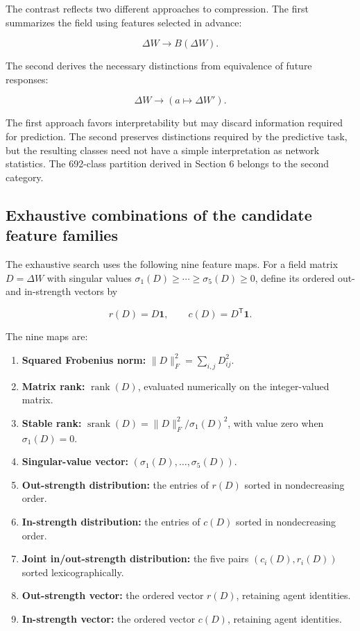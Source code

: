 \documentclass[
  11pt,
]{article}
\providecommand{\tightlist}{%
  \setlength{\itemsep}{0pt}\setlength{\parskip}{0pt}}
\begin{document}
The contrast reflects two different approaches to compression. The first
summarizes the field using features selected in advance:

\[{\Delta W\longrightarrow B(\Delta W).}\]

The second derives the necessary distinctions from equivalence of future
responses:

\[{\Delta W\longrightarrow\left(a\longmapsto\Delta W'\right).}\]

The first approach favors interpretability but may discard information
required for prediction. The second preserves distinctions required by
the predictive task, but the resulting classes need not have a simple
interpretation as network statistics. The 692-class partition derived in
Section 6 belongs to the second category.

\hypertarget{exhaustive-combinations-of-the-candidate-feature-families}{%
\subsection{Exhaustive combinations of the candidate feature
families}\label{exhaustive-combinations-of-the-candidate-feature-families}}

The exhaustive search uses the following nine feature maps. For a field
matrix \({D=\Delta W}\) with singular values
\({\sigma_1(D)\ge\cdots\ge\sigma_5(D)\ge0}\), define its ordered out-
and in-strength vectors by

\[{r(D)=D\mathbf 1,\qquad c(D)=D^{\mathsf T}\mathbf 1.}\]

The nine maps are:

\begin{enumerate}
\def\labelenumi{\arabic{enumi}.}
\tightlist
\item
  \textbf{Squared Frobenius norm:}
  \({\lVert D\rVert_F^2=\sum_{i,j}D_{ij}^2}\).
\item
  \textbf{Matrix rank:} \({\operatorname{rank}(D)}\), evaluated
  numerically on the integer-valued matrix.
\item
  \textbf{Stable rank:}
  \({\operatorname{srank}(D)=\lVert D\rVert_F^2/\sigma_1(D)^2}\), with
  value zero when \({\sigma_1(D)=0}\).
\item
  \textbf{Singular-value vector:}
  \({(\sigma_1(D),\ldots,\sigma_5(D))}\).
\item
  \textbf{Out-strength distribution:} the entries of \({r(D)}\) sorted
  in nondecreasing order.
\item
  \textbf{In-strength distribution:} the entries of \({c(D)}\) sorted in
  nondecreasing order.
\item
  \textbf{Joint in/out-strength distribution:} the five pairs
  \({(c_i(D),r_i(D))}\) sorted lexicographically.
\item
  \textbf{Out-strength vector:} the ordered vector \({r(D)}\), retaining
  agent identities.
\item
  \textbf{In-strength vector:} the ordered vector \({c(D)}\), retaining
  agent identities.
\end{enumerate}
\end{document}
